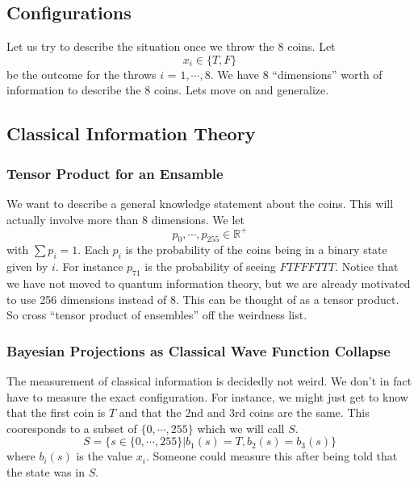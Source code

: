 \documentclass[12pt,a4paper]{article}
\begin{document}
\subsection{Configurations}
Let us try to describe the situation once we throw the 8 coins.  Let
\[
x_i \in \{T,F\}
\]
be the outcome for the throws $i$ = $1,\cdots,8$.  We have 8 ``dimensions'' worth of information to describe the 8 coins.  Lets move on and generalize.
  
\subsection{Classical Information Theory}
\subsubsection{Tensor Product for an Ensamble}
We want to describe a general knowledge statement about the coins.  This will actually involve more than 8 dimensions.  We let
\[
   p_0,\cdots,p_{255} \in \mathbb{R}^+
\]
with $\sum p_i = 1$.  Each $p_i$ is the probability of the coins being in a binary state given by $i$.  For instance $p_{71}$ is the probability of seeing $FTFFFTTT$. Notice that we have not moved to quantum information theory, but we are already motivated to use 256 dimensions instead of 8.  This can be thought of as a tensor product.  So cross ``tensor product of ensembles'' off the weirdness list.

\subsubsection{Bayesian Projections as Classical Wave Function Collapse}
The measurement of classical information is decidedly not weird.  We don't in fact have to measure the exact configuration.  For instance, we might just get to know that the first coin is $T$ and that the 2nd and 3rd coins are the same.  This cooresponds to a subset of $\{0,\cdots,255\}$ which we will call $S$.
\[
   S = \{s \in \{0,\cdots,255\} | b_1(s) = T, b_2(s) = b_3(s) \}
\]
where $b_i(s)$ is the value $x_i$.  Someone could measure this after being told that the state was in $S$.
\end{document}
